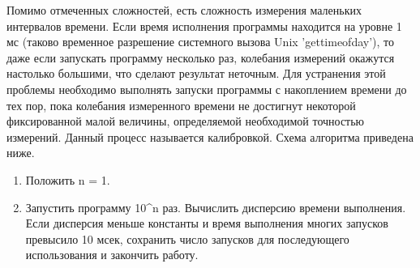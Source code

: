 Помимо отмеченных сложностей, есть сложность измерения маленьких интервалов времени. Если время исполнения программы находится на уровне 1 мс (таково временное разрешение системного вызова Unix 'gettimeofday'), то даже если запускать программу несколько раз, колебания измерений окажутся настолько большими, что сделают результат неточным. Для устранения этой проблемы необходимо выполнять запуски программы с накоплением времени до тех пор, пока колебания измеренного времени не достигнут некоторой фиксированной малой величины, определяемой необходимой точностью измерений. Данный процесс называется калибровкой. Схема алгоритма приведена ниже.

\begin{enumerate}
	\item Положить n = 1.
	\item Запустить программу 10^n раз. Вычислить дисперсию времени выполнения. Если дисперсия меньше константы \epsilon и время выполнения многих запусков превысило 10 мсек, сохранить число запусков для последующего использования и закончить работу.
\end{enumerate}


